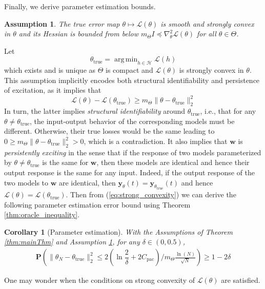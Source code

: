 \documentclass{ifacconf}
\def\eqref#1{(\ref{#1})}
\def\rvw{{\mathbf{w}}}
\def\rvy{{\mathbf{y}}}
\DeclareMathOperator*{\argmin}{arg\,min}
\newcommand{\bP}{\mathbf{P}}
\newtheorem{Assumption}{Assumption}[section]
\newtheorem{corollary}{Corollary}[section]
\begin{document}
Finally, we derive parameter estimation bounds. 
\begin{Assumption}
\label{assumption:strong_convexity}
  The true error map $\theta \mapsto \mathcal{L}(\theta)$ is smooth and strongly convex
    in $\theta$ and its Hessian is bounded from below
    $m_{\Theta}I \preceq \nabla^2_{\theta}\mathcal{L}(\theta)$
    for all $\theta \in \Theta$.
\end{Assumption}
Let 
\[ \theta_{\text{true}} = \argmin_{h \in \mathcal{H}} \mathcal{L}(h) \]
which exists and is unique as $\Theta$ is compact and
$\mathcal{L}(\theta)$ is strongly convex in $\theta$.
This assumption implicitly encodes both structural identifiability and persistence of excitation, as it implies that 
\begin{equation}
  \label{eq:strong_convexity}
\mathcal{L}(\theta) - \mathcal{L}(\theta_{\text{true}}) \ge m_{\Theta} \|\theta - \theta_{\text{true}}\|_2^2 
\end{equation}
In turn, the latter implies \emph{structural identifiability} around $\theta_{\text{true}}$, i.e.,
that for any $\theta \ne \theta_{\text{true}}$, 
the input-output behavior of the corresponding models must be different.
Otherwise, their true losses would be the same leading to
$0 \ge m_{\Theta} \|\theta - \theta_{\text{true}}\|_2^2 > 0$, which is a contradiction. 
It also implies that $\rvw$ is \emph{persistently exciting} in the sense that if
the response of two models parameterized by $\theta \ne \theta_{\text{true}}$ is the same for $\rvw$, then these models are identical and hence their output response is 
the same for any input. Indeed, if the output response of the two models to $\rvw$
are identical, then $\rvy_{\theta}(t)=\rvy_{\theta_{\text{true}}}(t)$  and hence
$\mathcal{L}(\theta) = \mathcal{L}(\theta_{\text{true}})$. Then 
from \eqref{eq:strong_convexity} we can derive the following parameter estimation error bound using Theorem \ref{thm:oracle_inequality}.
\begin{corollary}[Parameter estimation]
  \label{cor:parameter_estimation}
    With the Assumptions of Theorem \ref{thm:mainThm} and Assumption \ref{assumption:strong_convexity}, for any $\delta \in (0,0.5)$,
    \begin{multline}
     \bP(\|\theta_N - \theta_{\text{true}}\|_2^2 \le 2(\ln\dfrac{2}{\delta}+ 2C_{\text{pac}})/m_{\Theta} \frac{\ln(N)}{\sqrt{N}}) \ge 1-2\delta
    \end{multline}
\end{corollary} 
One may wonder when the conditions on strong convexity of $\mathcal{L}(\theta)$ are satisfied.
\end{document}

